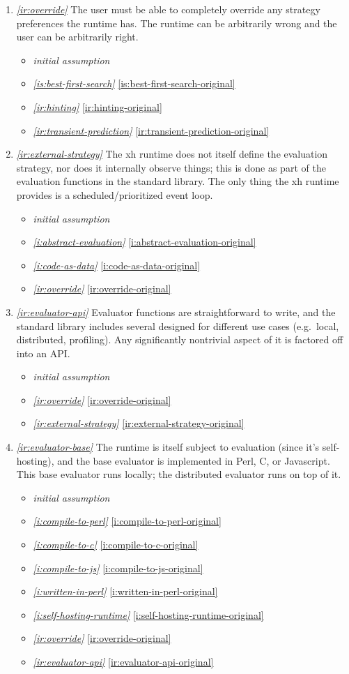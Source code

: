 \documentclass{report}
\makeatletter
\newcommand*{\Label}[2]{%
  \@bsphack
  \begingroup
    \label{#1-original}%
    \def\@currentlabel{#2}%
    \label{#1}%
  \endgroup
  \@esphack
}
\newcommand{\initial}{{\em initial assumption}}
\newcommand{\refboth}[1]{{\em \ref{#1}} \ref{#1-original}}
\makeatother
\begin{document}
\begin{enumerate}
\item{}\Label{ir:override}{xhr.override}{\em\ref{ir:override}}
  The user must be able to completely override any strategy preferences the
  runtime has. The runtime can be arbitrarily wrong and the user can be
  arbitrarily right.
\begin{itemize}
\item \initial
\item \refboth{is:best-first-search}
\item \refboth{ir:hinting}
\item \refboth{ir:transient-prediction}
\end{itemize}
\item{}\Label{ir:external-strategy}{xhr.externalstrategy}{\em\ref{ir:external-strategy}}
  The xh runtime does not itself define the evaluation strategy, nor does
  it internally observe things; this is done as part of the evaluation
  functions in the standard library. The only thing the xh runtime provides
  is a scheduled/prioritized event loop.
\begin{itemize}
\item \initial
\item \refboth{i:abstract-evaluation}
\item \refboth{i:code-as-data}
\item \refboth{ir:override}
\end{itemize}
\item{}\Label{ir:evaluator-api}{xhr.evaluatorapi}{\em\ref{ir:evaluator-api}}
  Evaluator functions are straightforward to write, and the standard
  library includes several designed for different use cases (e.g.~local,
  distributed, profiling). Any significantly nontrivial aspect of it is
  factored off into an API.
\begin{itemize}
\item \initial
\item \refboth{ir:override}
\item \refboth{ir:external-strategy}
\end{itemize}
\item{}\Label{ir:evaluator-base}{xhr.evaluatorbase}{\em\ref{ir:evaluator-base}}
  The runtime is itself subject to evaluation (since it's self-hosting),
  and the base evaluator is implemented in Perl, C, or Javascript. This
  base evaluator runs locally; the distributed evaluator runs on top of it.
\begin{itemize}
\item \initial
\item \refboth{i:compile-to-perl}
\item \refboth{i:compile-to-c}
\item \refboth{i:compile-to-js}
\item \refboth{i:written-in-perl}
\item \refboth{i:self-hosting-runtime}
\item \refboth{ir:override}
\item \refboth{ir:evaluator-api}
\end{itemize}


\end{enumerate}
\end{document}
